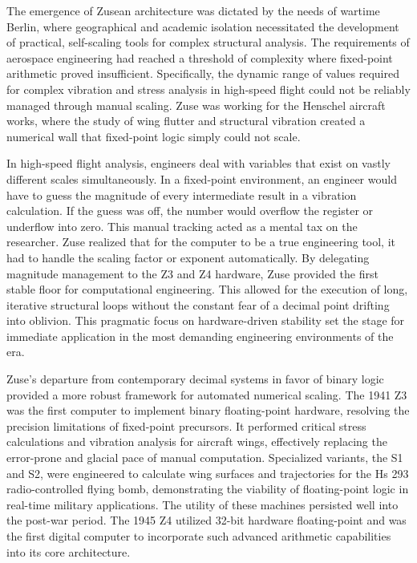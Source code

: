 The emergence of Zusean architecture was dictated by the needs of wartime Berlin, where geographical and academic isolation necessitated the development of practical, self-scaling tools for complex structural analysis. The requirements of aerospace engineering had reached a threshold of complexity where fixed-point arithmetic proved insufficient. Specifically, the dynamic range of values required for complex vibration and stress analysis in high-speed flight could not be reliably managed through manual scaling. Zuse was working for the Henschel aircraft works, where the study of wing flutter and structural vibration created a numerical wall that fixed-point logic simply could not scale. 

In high-speed flight analysis, engineers deal with variables that exist on vastly different scales simultaneously. In a fixed-point environment, an engineer would have to guess the magnitude of every intermediate result in a vibration calculation. If the guess was off, the number would overflow the register or underflow into zero. This manual tracking acted as a mental tax on the researcher. Zuse realized that for the computer to be a true engineering tool, it had to handle the scaling factor or exponent automatically. By delegating magnitude management to the Z3 and Z4 hardware, Zuse provided the first stable floor for computational engineering. This allowed for the execution of long, iterative structural loops without the constant fear of a decimal point drifting into oblivion. This pragmatic focus on hardware-driven stability set the stage for immediate application in the most demanding engineering environments of the era. 

Zuse’s departure from contemporary decimal systems in favor of binary logic provided a more robust framework for automated numerical scaling. The 1941 Z3 was the first computer to implement binary floating-point hardware, resolving the precision limitations of fixed-point precursors. It performed critical stress calculations and vibration analysis for aircraft wings, effectively replacing the error-prone and glacial pace of manual computation. Specialized variants, the S1 and S2, were engineered to calculate wing surfaces and trajectories for the Hs 293 radio-controlled flying bomb, demonstrating the viability of floating-point logic in real-time military applications. The utility of these machines persisted well into the post-war period. The 1945 Z4 utilized 32-bit hardware floating-point and was the first digital computer to incorporate such advanced arithmetic capabilities into its core architecture. 

